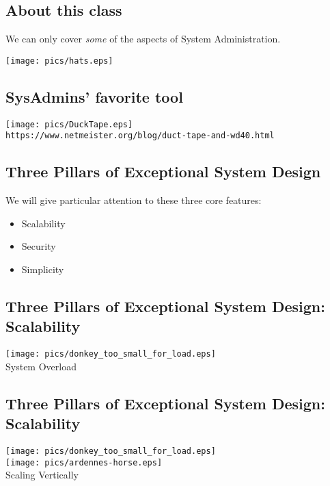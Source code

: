\documentclass[xga]{xdvislides}
\begin{document}
\subsection{About this class}
We can only cover {\em some} of the aspects of System Administration.
\vspace*{\fill}
\begin{center}
	\texttt{[image: pics/hats.eps]}
\Normalsize
\end{center}
\vspace*{\fill}

\subsection{SysAdmins' favorite tool}
\begin{center}
	\texttt{[image: pics/DuckTape.eps]} \\
	\vspace{.5in}
	\small
	\verb+https://www.netmeister.org/blog/duct-tape-and-wd40.html+
	\Normalsize
\end{center}

\subsection{Three Pillars of Exceptional System Design}
We will give particular attention to these three core features:
\begin{itemize}
	\item Scalability
	\item Security
	\item Simplicity
\end{itemize}

\subsection{Three Pillars of Exceptional System Design: Scalability}
\vspace*{\fill}
\begin{center}
    \texttt{[image: pics/donkey\_too\_small\_for\_load.eps]} \\
	System Overload
\end{center}
\vspace*{\fill}

\subsection{Three Pillars of Exceptional System Design: Scalability}
\vspace*{\fill}
\begin{center}
    \texttt{[image: pics/donkey\_too\_small\_for\_load.eps]} \\
    \texttt{[image: pics/ardennes-horse.eps]} \\
	Scaling Vertically
\end{center}
\vspace*{\fill}
\end{document}
